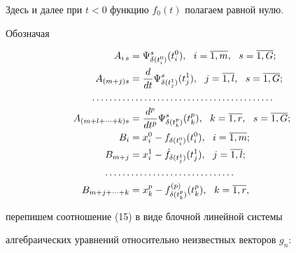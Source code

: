 \begin{note}


Здесь и далее при $t<0$ функцию $f_0(t)$ полагаем равной нулю.


\end{note}





Обозначая


\begin{align}


A_{i\,s}&=\Psi_{\delta(t_i^0)}^s(t_i^0),\ \


i=\overline{1,m},\ \ s=\overline{1,G};\notag \\


%


A_{(m+j)s}&= \frac{d}{dt}\Psi_{\delta(t_j^1)}^s(t_j^1),\ \


j=\overline{1,l},\ \ s=\overline{1,G};\notag \\


\dotsc\dotsc\dotsc&\dotsc\dotsc\dotsc\dotsc\dotsc\dotsc\dotsc\dotsc\dotsc\dotsc\dotsc\notag \\


%


A_{(m+l+\dotsb+k)s}&=


\frac{d^p}{dt^p}\Psi_{\delta(t_k^p)}^s(t_k^p),\ \


k=\overline{1,r},\ \ s=\overline{1,G};\\ 


%


B_i&=x_i^0- f_{\delta(t_i^0)}(t_i^0),\ \ i=\overline{1,m};\notag \\


%


B_{m+j}&=x_i^1-\Dot{f}_{\delta(t_j^1)}(t_j^1),\ \ 


j=\overline{1,l};\notag \\


\dotsc\dotsc&\dotsc\dotsc\dotsc\dotsc\dotsc\dotsc\dotsc\dotsc\notag \\


%


B_{m+j+\dotsb+k}&=x_k^p-f_{\delta(t_k^p)}^{(p)}(t_k^p),\ \


k=\overline{1,r}, 


\end{align}


перепишем соотношение (15) в виде блочной линейной системы


алгебраических уравнений относительно неизвестных векторов $g_n$:


